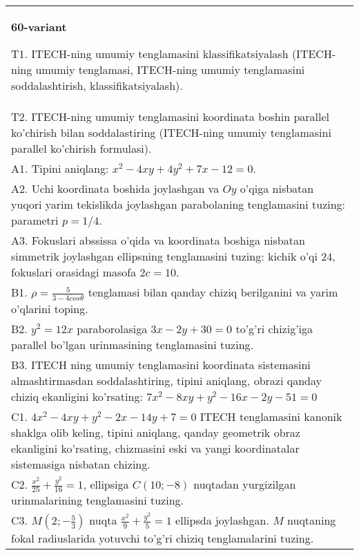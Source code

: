 \documentclass{article}
\begin{document}
\begin{tabular}{m{17cm}}
\textbf{60-variant}
\newline

T1. ITECH-ning umumiy tenglamasini klassifikatsiyalash (ITECH-ning umumiy tenglamasi, ITECH-ning umumiy tenglamasini soddalashtirish, klassifikatsiyalash).\\

T2. ITECH-ning umumiy tenglamasini koordinata boshin parallel ko'chirish bilan soddalastiring (ITECH-ning umumiy tenglamasini parallel ko'chirish formulasi).\\

A1. Tipini aniqlang: $x^{2}-4xy+4y^{2}+7x-12=0$.\\

A2. Uchi koordinata boshida joylashgan va $Oy$ o'qiga nisbatan yuqori yarim tekislikda joylashgan parabolaning tenglamasini tuzing: parametri $p=1/4$.\\

A3. Fokuslari abssissa o'qida va koordinata boshiga nisbatan simmetrik joylashgan ellipsning tenglamasini tuzing: kichik o'qi $24$, fokuslari orasidagi masofa $2c=10$.\\

B1. $\rho = \frac{5}{3 - 4cos\theta}$ tenglamasi bilan qanday chiziq berilganini va yarim o'qlarini toping.  \\

B2. $y^{2} = 12x$ paraborolasiga $3x - 2y + 30 = 0$ to'g'ri chizig'iga parallel bo'lgan urinmasining tenglamasini tuzing.  \\

B3. ITECH ning umumiy tenglamasini koordinata sistemasini almashtirmasdan soddalashtiring, tipini aniqlang, obrazi qanday chiziq ekanligini ko'rsating: $7x^{2} - 8xy + y^{2} - 16x - 2y - 51 = 0$\\

C1. $4x^{2} - 4xy + y^{2} - 2x - 14y + 7 = 0$ ITECH tenglamasini kanonik shaklga olib keling, tipini aniqlang, qanday geometrik obraz ekanligini ko'rsating, chizmasini eski va yangi koordinatalar sistemasiga nisbatan chizing.  \\

C2. $\frac{x^{2}}{25} + \frac{y^{2}}{16} = 1$, ellipsiga $C(10; - 8)$ nuqtadan yurgizilgan urinmalarining tenglamasini tuzing.  \\

C3. $M(2; - \frac{5}{3})$ nuqta $\frac{x^{2}}{9} + \frac{y^{2}}{5} = 1$ ellipsda joylashgan. $M$ nuqtaning fokal radiuslarida yotuvchi to'g'ri chiziq tenglamalarini tuzing.  \\

\end{tabular}
\vspace{1cm}
\end{document}
